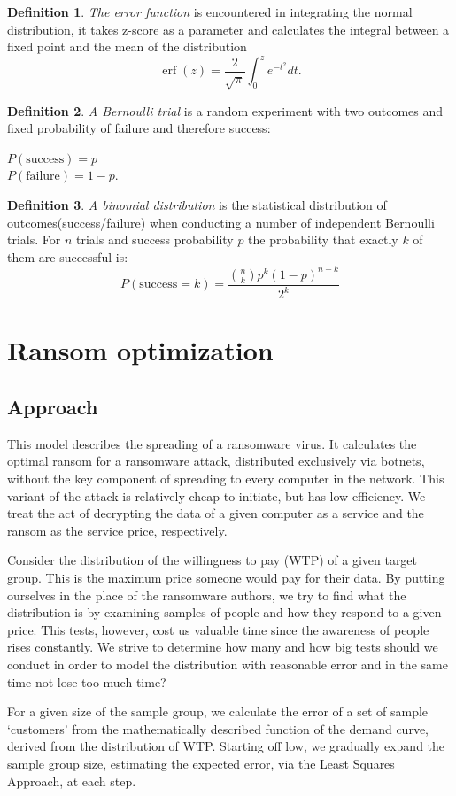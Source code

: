 \documentclass[11pt, a4paper]{article}
\theoremstyle{definition}
\newtheorem{definition}{Definition}
\begin{document}
		\begin{definition}
			\label{def:err}
			\emph{The error function} is encountered in integrating the normal distribution, it takes z-score as a parameter and calculates the integral between a fixed point and the mean of the distribution
			$$\operatorname{erf}(z)=\dfrac{2}{\sqrt{\pi}}\int_{0}^{z}e^{-t^{2}}dt.$$
		\end{definition}
		\newpage
		\begin{definition}
			\label{def:Bernoulli_trial}
			\emph{A Bernoulli trial} is a random experiment with two outcomes and fixed probability of failure and therefore success:
			\begin{center}
			$P(\text{success})=p$\\
			$P(\text{failure})=1-p.$
			\end{center}
		\end{definition}
	
		\begin{definition}
			\label{def:Binomial_distribution}
			\emph{A binomial distribution} is the statistical distribution of outcomes(success/failure) when conducting a number of independent Bernoulli trials.
			For $n$ trials and success probability $p$ the probability that exactly $k$ of them are successful is:
			$$
			P(\text{success} = k) = \frac{\binom{n}{k}p^{k}(1-p)^{n-k}}{2^k}
			$$
		\end{definition}
	\section{Ransom optimization}
		\subsection{Approach}
			This model describes the spreading of a ransomware virus. It calculates the optimal ransom for a ransomware attack, distributed exclusively via botnets, without the key component of spreading to every computer in the network. This variant of the attack is relatively cheap to initiate, but has low efficiency.	We treat the act of decrypting the data of a given computer as a service and the ransom as the service price, respectively. \par
			Consider the distribution of the willingness to pay (WTP) of a given target group. This is the maximum price someone would pay for their data. By putting ourselves in the place of the ransomware authors, we try to find what the distribution is by examining samples of people and how they respond to a given price. This tests, however, cost us valuable time since the awareness of people rises constantly. We strive to determine how many and how big tests should we conduct in order to model the distribution with reasonable error and in the same time not lose too much time?\par
			For a given size of the sample group, we calculate the error of a set of sample `customers' from the mathematically described function of the demand curve, derived from the distribution of WTP. Starting off low, we gradually expand the sample group size, estimating the expected error, via the Least Squares Approach, at each step.
\end{document}
